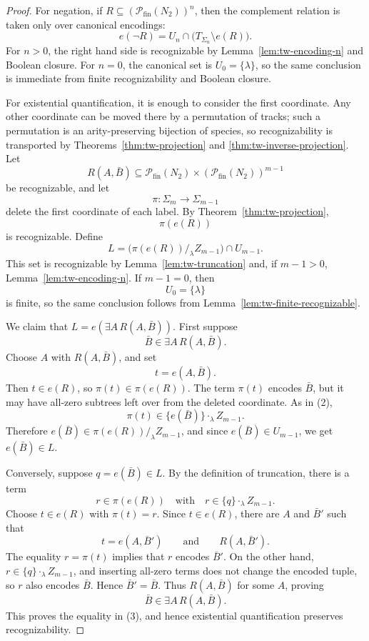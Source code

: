 \documentclass[11pt]{article}
\theoremstyle{definition}
\newcommand{\powfin}{\mathcal P_{\mathrm{fin}}}
\newcommand{\Term}[1]{T_{#1}}
\begin{document}
\begin{proof}
For negation, if \(R\subseteq(\powfin(N_2))^n\), then the complement relation is
taken only over canonical encodings:
\[
  e(\neg R)
  =
  U_n\cap\bigl(\Term{\Sigma_n}\setminus e(R)\bigr).
\]
For \(n>0\), the right hand side is recognizable by
Lemma~\ref{lem:tw-encoding-n} and Boolean closure.  For \(n=0\), the canonical
set is \(U_0=\{\lambda\}\), so the same conclusion is immediate from finite
recognizability and Boolean closure.

For existential quantification, it is enough to consider the first coordinate.
Any other coordinate can be moved there by a permutation of tracks; such a
permutation is an arity-preserving bijection of species, so recognizability is
transported by Theorems~\ref{thm:tw-projection} and
\ref{thm:tw-inverse-projection}.  Let
\[
  R(A,\bar B)
  \subseteq
  \powfin(N_2)\times(\powfin(N_2))^{m-1}
\]
be recognizable, and let
\[
  \pi:\Sigma_m\to\Sigma_{m-1}
\]
delete the first coordinate of each label.  By Theorem~\ref{thm:tw-projection},
\[
  \pi(e(R))
\]
is recognizable.  Define
\[
  L=
  \bigl(\pi(e(R))/_{\lambda}Z_{m-1}\bigr)\cap U_{m-1}.       \tag{3}
\]
This set is recognizable by Lemma~\ref{lem:tw-truncation} and, if
\(m-1>0\), Lemma~\ref{lem:tw-encoding-n}.  If \(m-1=0\), then
\[
  U_0=\{\lambda\}
\]
is finite, so the same conclusion follows from
Lemma~\ref{lem:tw-finite-recognizable}.

We claim that \(L=e(\exists A\,R(A,\bar B))\).  First suppose
\[
  \bar B\in \exists A\,R(A,\bar B).
\]
Choose \(A\) with \(R(A,\bar B)\), and set
\[
  t=e(A,\bar B).
\]
Then \(t\in e(R)\), so \(\pi(t)\in\pi(e(R))\).  The term \(\pi(t)\) encodes
\(\bar B\), but it may have all-zero subtrees left over from the deleted
coordinate.  As in (2),
\[
  \pi(t)\in\{e(\bar B)\}\cdot_\lambda Z_{m-1}.
\]
Therefore \(e(\bar B)\in \pi(e(R))/_{\lambda}Z_{m-1}\), and since
\(e(\bar B)\in U_{m-1}\), we get \(e(\bar B)\in L\).

Conversely, suppose \(q=e(\bar B)\in L\).  By the definition of truncation,
there is a term
\[
  r\in \pi(e(R))
  \quad\text{with}\quad
  r\in\{q\}\cdot_\lambda Z_{m-1}.
\]
Choose \(t\in e(R)\) with \(\pi(t)=r\).  Since \(t\in e(R)\), there are
\(A\) and \(\bar B'\) such that
\[
  t=e(A,\bar B')
  \qquad\text{and}\qquad
  R(A,\bar B').
\]
The equality \(r=\pi(t)\) implies that \(r\) encodes \(\bar B'\).  On the other
hand, \(r\in\{q\}\cdot_\lambda Z_{m-1}\), and inserting all-zero terms does not
change the encoded tuple, so \(r\) also encodes \(\bar B\).  Hence
\(\bar B'=\bar B\).  Thus \(R(A,\bar B)\) for some \(A\), proving
\[
  \bar B\in\exists A\,R(A,\bar B).
\]
This proves the equality in (3), and hence existential quantification preserves
recognizability.
\end{proof}
\end{document}
